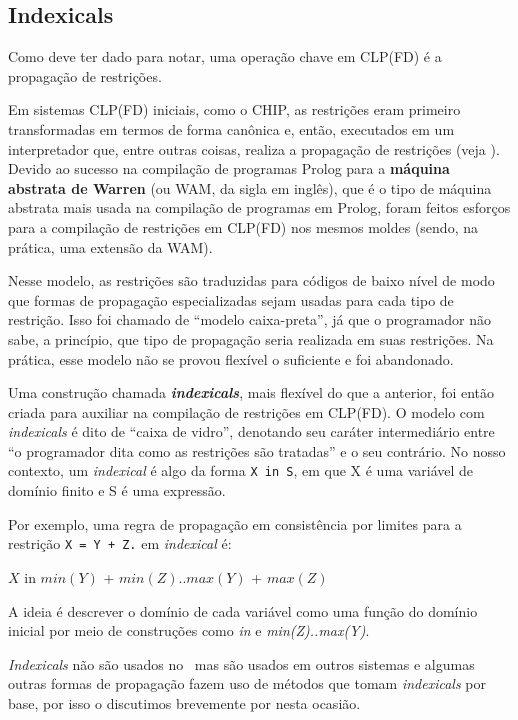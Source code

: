 \documentclass{article}
\begin{document}
\subsection{Indexicals}

Como deve ter dado para notar, uma operação chave em CLP(FD) é a propagação de restrições.

Em sistemas CLP(FD) iniciais, como o CHIP, as restrições eram primeiro transformadas em termos de forma canônica
e, então, executados em um interpretador que, entre outras coisas, realiza a propagação de restrições (veja \cite{zhou}).
Devido ao sucesso na compilação de programas Prolog para a \textbf{máquina abstrata de Warren} (ou WAM, da sigla em inglês),
que é o tipo de máquina abstrata mais usada na compilação de programas em Prolog, foram feitos esforços para a compilação
de restrições em CLP(FD) nos mesmos moldes (sendo, na prática, uma extensão da WAM).

Nesse modelo, as restrições são traduzidas para códigos de baixo nível de modo que formas de propagação especializadas sejam
usadas para cada tipo de restrição. Isso foi chamado de ``modelo caixa-preta'', já que o programador não sabe,
a princípio, que tipo de propagação seria realizada em suas restrições. Na prática, esse modelo não se provou flexível o suficiente
e foi abandonado.

Uma construção chamada \textbf{\textit{indexicals}}, mais flexível do que a anterior, foi então criada para auxiliar na compilação de
restrições em CLP(FD). O modelo com \textit{indexicals} é dito de ``caixa de vidro'', denotando seu caráter intermediário entre
``o programador dita como as restrições são tratadas'' e o seu contrário. No nosso contexto, um \textit{indexical} é algo da forma {\tt X in S}, em que X é uma variável de domínio finito e S é uma expressão.

Por exemplo, uma regra de propagação em consistência por limites para a restrição {\tt X = Y + Z.} em \textit{indexical} é:

    $X$ in $min(Y)$ + $min(Z)..max(Y)$ + $max(Z)$

A ideia é descrever o domínio de cada variável como uma função do domínio inicial por meio de construções como \textit{in} e \textit{min(Z)..max(Y)}.

\textit{Indexicals} não são usados no \eclipse\, mas são usados em outros sistemas e algumas outras formas de propagação fazem
uso de métodos que tomam \textit{indexicals} por base, por isso o discutimos brevemente por nesta ocasião.
\end{document}
